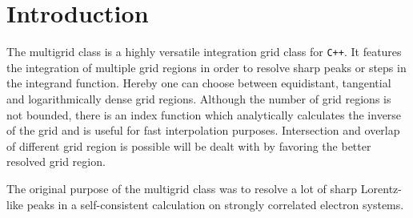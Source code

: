 \chapter{Introduction}

The multigrid class is a highly versatile integration grid class for \texttt{C++}. It features the integration of multiple grid regions in order to resolve sharp peaks or steps in the integrand function. Hereby one can choose between equidistant, tangential and logarithmically dense grid regions. Although the number of grid regions is not bounded, there is an index function which analytically calculates the inverse of the grid and is useful for fast interpolation purposes. Intersection and overlap of different grid region is possible will be dealt with by favoring the better resolved grid region.

The original purpose of the multigrid class was to resolve a lot of sharp Lorentz-like peaks in a self-consistent calculation on strongly correlated electron systems.

